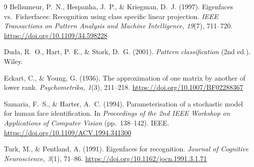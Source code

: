 \documentclass[10pt,a4paper]{article}
\begin{document}
\begin{thebibliography}{9}
Belhumeur, P.~N., Hespanha, J.~P., \& Kriegman, D.~J. (1997). Eigenfaces vs.\
Fisherfaces: Recognition using class specific linear projection. \emph{IEEE
Transactions on Pattern Analysis and Machine Intelligence, 19}(7), 711--720.
\url{https://doi.org/10.1109/34.598228}

Duda, R.~O., Hart, P.~E., \& Stork, D.~G. (2001). \emph{Pattern classification}
(2nd ed.). Wiley.

Eckart, C., \& Young, G. (1936). The approximation of one matrix by another of
lower rank. \emph{Psychometrika, 1}(3), 211--218.
\url{https://doi.org/10.1007/BF02288367}

Samaria, F.~S., \& Harter, A.~C. (1994). Parameterisation of a stochastic model
for human face identification. In \emph{Proceedings of the 2nd IEEE Workshop on
Applications of Computer Vision} (pp.~138--142). IEEE.
\url{https://doi.org/10.1109/ACV.1994.341300}

Turk, M., \& Pentland, A. (1991). Eigenfaces for recognition. \emph{Journal of
Cognitive Neuroscience, 3}(1), 71--86.
\url{https://doi.org/10.1162/jocn.1991.3.1.71}
\end{thebibliography}
\end{document}
